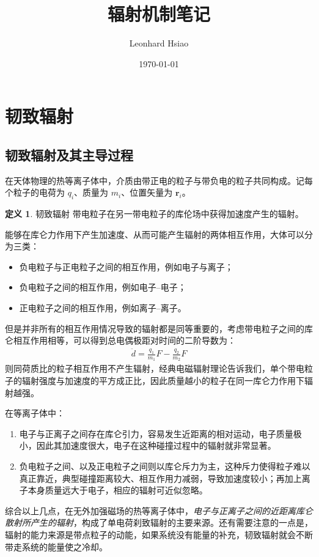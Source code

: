 \documentclass[12pt,oneside]{ctexart}
\title{辐射机制笔记}
\author{Leonhard Hsiao}
\date{\today}
\theoremstyle{definition}
\newtheorem{definition}{定义}[section]
\theoremstyle{plain}
\theoremstyle{remark}
\begin{document}
\maketitle
\tableofcontents

\section{韧致辐射}
\subsection{韧致辐射及其主导过程}
在天体物理的热等离子体中，介质由带正电的粒子与带负电的粒子共同构成。记每个粒子的电荷为 $q_i$、质量为 $m_i$、位置矢量为 $\boldsymbol r_i$。
\begin{definition}{韧致辐射}
    带电粒子在另一带电粒子的库伦场中获得加速度产生的辐射。
\end{definition}
能够在库仑力作用下产生加速度、从而可能产生辐射的两体相互作用，大体可以分为三类：
\begin{itemize}
  \item 负电粒子与正电粒子之间的相互作用，例如电子与离子；
  \item 负电粒子之间的相互作用，例如电子--电子；
  \item 正电粒子之间的相互作用，例如离子--离子。
\end{itemize}
但是并非所有的相互作用情况导致的辐射都是同等重要的，考虑带电粒子之间的库仑相互作用相等，可以得到总电偶极距对时间的二阶导数为：
\begin{align}
    \ddot{d} = \frac{q_1}{m_1}F - \frac{q_2}{m_2}F
\end{align}
则同荷质比的粒子相互作用不产生辐射，经典电磁辐射理论告诉我们，单个带电粒子的辐射强度与加速度的平方成正比，因此质量越小的粒子在同一库仑力作用下辐射越强。

在等离子体中：
\begin{enumerate}
  \item 电子与正离子之间存在库仑引力，容易发生近距离的相对运动，电子质量极小，因此其加速度很大，电子在这种碰撞过程中的辐射就非常显著。
  \item 负电粒子之间、以及正电粒子之间则以库仑斥力为主，这种斥力使得粒子难以真正靠近，典型碰撞距离较大、相互作用力减弱，导致加速度较小；再加上离子本身质量远大于电子，相应的辐射可近似忽略。
\end{enumerate}

综合以上几点，在无外加强磁场的热等离子体中，\emph{电子与正离子之间的近距离库仑散射所产生的辐射}，构成了单电荷刹致辐射的主要来源。还有需要注意的一点是，辐射的能力来源是带点粒子的动能，如果系统没有能量的补充，韧致辐射就会不断带走系统的能量使之冷却。
\end{document}
